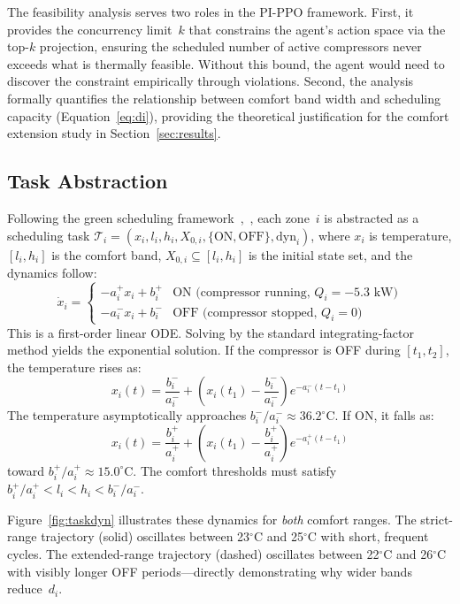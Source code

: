 \documentclass[12pt,a4paper]{article}
\begin{document}
The feasibility analysis serves two roles in the PI-PPO framework. First, it provides the concurrency limit~$k$ that constrains the agent's action space via the top-$k$ projection, ensuring the scheduled number of active compressors never exceeds what is thermally feasible. Without this bound, the agent would need to discover the constraint empirically through violations. Second, the analysis formally quantifies the relationship between comfort band width and scheduling capacity (Equation~\eqref{eq:di}), providing the theoretical justification for the comfort extension study in Section~\ref{sec:results}.

\subsection{Task Abstraction}

Following the green scheduling framework~\cite{ref40},~\cite{ref41}, each zone~$i$ is abstracted as a scheduling task $\mathcal{T}_i = (x_i, l_i, h_i, X_{0,i}, \{\text{ON}, \text{OFF}\}, \text{dyn}_i)$, where $x_i$ is temperature, $[l_i, h_i]$ is the comfort band, $X_{0,i} \subseteq [l_i, h_i]$ is the initial state set, and the dynamics follow:
\begin{equation}
\dot{x}_i = \begin{cases}
-a_i^+ x_i + b_i^+ & \text{ON (compressor running, } Q_i = -5.3 \text{ kW)} \\
-a_i^- x_i + b_i^- & \text{OFF (compressor stopped, } Q_i = 0 \text{)}
\end{cases}
\end{equation}
This is a first-order linear ODE. Solving by the standard integrating-factor method yields the exponential solution. If the compressor is OFF during $[t_1, t_2]$, the temperature rises as:
\begin{equation}
x_i(t) = \frac{b_i^-}{a_i^-} + \left(x_i(t_1) - \frac{b_i^-}{a_i^-}\right) e^{-a_i^-(t - t_1)}
\end{equation}
The temperature asymptotically approaches $b_i^-/a_i^- \approx 36.2^\circ$C. If ON, it falls as:
\begin{equation}
x_i(t) = \frac{b_i^+}{a_i^+} + \left(x_i(t_1) - \frac{b_i^+}{a_i^+}\right) e^{-a_i^+(t - t_1)}
\end{equation}
toward $b_i^+/a_i^+ \approx 15.0^\circ$C. The comfort thresholds must satisfy $b_i^+/a_i^+ < l_i < h_i < b_i^-/a_i^-$.

Figure~\ref{fig:taskdyn} illustrates these dynamics for \textit{both} comfort ranges. The strict-range trajectory (solid) oscillates between 23$^\circ$C and 25$^\circ$C with short, frequent cycles. The extended-range trajectory (dashed) oscillates between 22$^\circ$C and 26$^\circ$C with visibly longer OFF periods---directly demonstrating why wider bands reduce~$d_i$.
\end{document}
